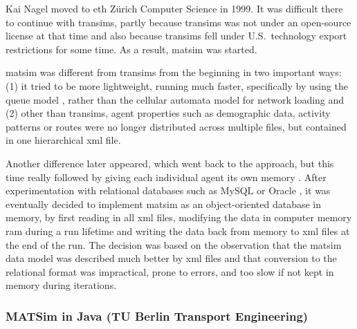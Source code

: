 Kai Nagel moved to \gls{eth} Zürich Computer Science in 1999.  It was difficult there to continue with \gls{transims}, partly because \gls{transims} was not under an open-source license at that time and also because \gls{transims} fell under U.S.\ technology export restrictions for some time.  As a result, \gls{matsim} was started.

\gls{matsim} was different from  \gls{transims} from the beginning in two important ways: (1) it tried to be more lightweight, \ie running much faster, specifically by using the queue model \citep{Gawron_IJMPC_1998}, rather than the cellular automata model for network loading and (2) other than \gls{transims}, agent properties such as demographic data, activity patterns or routes were no longer distributed across multiple files, but contained in one hierarchical \gls{xml} file.

Another difference later appeared, which went back to the \citet{Nagel1996NRW} approach, but this time really followed \citet{ArthurBar} by giving each individual agent its own memory \citep{RaneyNagel2006traf-framework}.  After experimentation with relational databases such as MySQL \citep{mysql-wikipedia} or Oracle \citep{oracle}, it was eventually decided to implement \gls{matsim} as an object-oriented database in memory, \ie by first reading in all \gls{xml} files, modifying the data in computer memory \gls{ram} during a run lifetime and writing the data back from memory to \gls{xml} files at the end of the run.  The decision was based on the observation that the \gls{matsim} data model was described much better by \gls{xml} files and that conversion to the relational format was impractical, prone to errors, and too slow if not kept in memory during iterations. 

\subsubsection{MATSim in Java (TU Berlin Transport Engineering)}
\label{sec:matsim-in-java}

